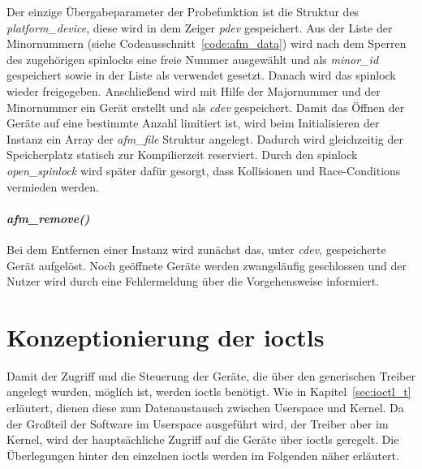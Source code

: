 Der einzige Übergabeparameter der Probefunktion ist die Struktur des \textit{platform\_device}, diese wird in dem Zeiger \textit{pdev} gespeichert. 
Aus der Liste der Minornummern (siehe Codeausschnitt~\ref{code:afm_data}) wird nach dem Sperren des zugehörigen \glspl{spinlock} eine freie Nummer ausgewählt und als \textit{minor\_id} gespeichert sowie in der Liste als verwendet gesetzt. Danach wird das \gls{spinlock} wieder freigegeben.
Anschließend wird mit Hilfe der Majornummer und der Minornummer ein Gerät erstellt und als \textit{cdev} gespeichert. 
Damit das Öffnen der Geräte auf eine bestimmte Anzahl limitiert ist, wird beim Initialisieren der Instanz ein Array der \textit{afm\_file} Struktur angelegt. Dadurch wird gleichzeitig der Speicherplatz statisch zur Kompilierzeit reserviert. Durch den \gls{spinlock} \textit{open\_spinlock} wird später dafür gesorgt, dass Kollisionen und Race-Conditions vermieden werden.

\paragraph*{\textit{afm\_remove()}}
Bei dem Entfernen einer Instanz wird zunächst das, unter \textit{cdev}, gespeicherte Gerät aufgelöst. Noch geöffnete Geräte werden zwangsläufig geschlossen und der Nutzer wird durch eine Fehlermeldung über die Vorgehensweise informiert.


\section{Konzeptionierung der \acl{ioctl}s}\label{sec:ioctl}
Damit der Zugriff und die Steuerung der Geräte, die über den generischen Treiber angelegt wurden, möglich ist, werden \ac{ioctl}s benötigt. 
Wie in Kapitel~\ref{sec:ioctl_t} erläutert, dienen diese zum Datenaustausch zwischen Userspace und Kernel. Da der Großteil der Software im Userspace ausgeführt wird, der Treiber aber im Kernel, wird der hauptsächliche Zugriff auf die Geräte über \ac{ioctl}s geregelt. Die Überlegungen hinter den einzelnen \ac{ioctl}s werden im Folgenden näher erläutert.\\


